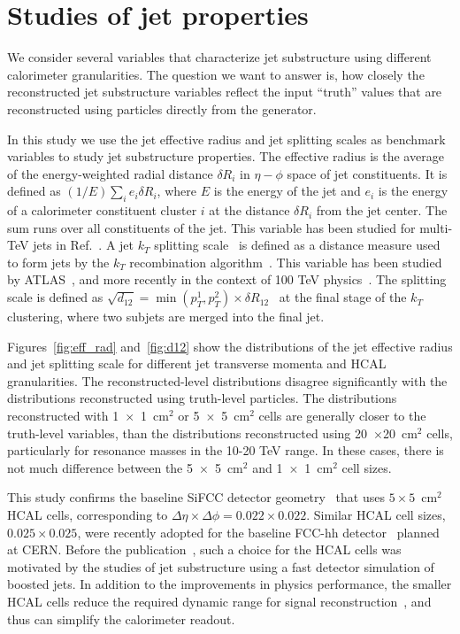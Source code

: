 \section{Studies of jet properties}
\label{sec:jets}

We consider several variables that characterize jet substructure using different calorimeter granularities. The question we want to answer is, how closely the reconstructed
jet substructure variables reflect the input ``truth'' values  that are reconstructed using particles directly from the \pythia generator.

In this study we use the jet effective radius and jet splitting scales as benchmark variables
to study jet substructure properties. 
The effective radius is the average of the energy-weighted radial distance $\delta R_i$ in $\eta-\phi$ space of jet constituents.
It is defined as $(1/E) \sum_i e_i \delta R_i$, where $E$ is the energy of the jet and $e_i$ is the energy of a calorimeter 
constituent cluster $i$ at the distance $\delta R_i$ from the jet center. The sum runs over all constituents of the jet. 
This variable has been studied for multi-TeV jets in Ref.~\cite{Auerbach:2014xua}.
A jet $k_T$ splitting scale~\cite{Butterworth:2002tt} is defined as a distance measure
used to form jets by the $k_T$ recombination
algorithm~\cite{Catani1993187,Ellis:1993tq}.
This variable has been studied by ATLAS~\cite{ATLAS:2012am}, and more recently in the context of 100 TeV physics~\cite{Auerbach:2014xua}.
The splitting scale is defined as $\sqrt{d_{12}}=\min(p_T^1,p_T^2) \times \delta R_{12}$~\cite{ATLAS:2012am} 
 at the final stage of the $k_T$ clustering, where two subjets are merged into the final jet.

Figures~\ref{fig:eff_rad} and~\ref{fig:d12} show the distributions of 
the jet effective radius and jet splitting scale for  different jet transverse momenta and HCAL granularities. 
The reconstructed-level distributions  disagree significantly with the distributions  
reconstructed using truth-level particles. The distributions reconstructed with 1~$\times$~1~cm$^2$ or 5~$\times$~5~cm$^2$ cells 
 are generally closer to the truth-level variables, than the distributions 
reconstructed using 20~$\times$20~cm$^2$ cells, particularly for resonance masses in the 10-20 TeV range. In these cases, there is not much  difference between the 
 5~$\times$~5~cm$^2$ and  1~$\times$~1~cm$^2$ cell sizes. 

This study confirms the  baseline SiFCC detector geometry~\cite{Chekanov:2016ppq} that uses $5 \times 5$~cm$^2$ HCAL cells,
corresponding to $\Delta \eta \times \Delta \phi = 0.022\times0.022$.
Similar HCAL cell sizes,  $0.025\times0.025$,  were recently adopted for the baseline FCC-hh detector~\cite{fcc1,fcc2} planned at CERN.
Before the publication~\cite{Chekanov:2016ppq},   such a choice for the HCAL cells   
was motivated by the studies of jet substructure  using a fast detector simulation of boosted jets.
In addition to the improvements in physics performance, the smaller HCAL cells 
reduce the required dynamic range for 
signal reconstruction~\cite{Chekanov:2015ihl}, and thus can simplify the calorimeter readout.

